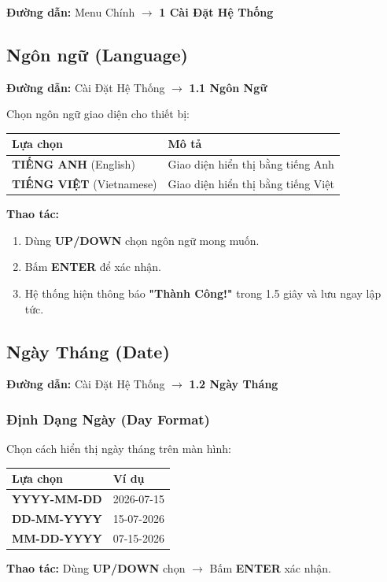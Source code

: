 \documentclass[12pt,a4paper]{article}
\begin{document}
\textbf{Đường dẫn:} Menu Chính $\rightarrow$ \textbf{1 Cài Đặt Hệ Thống}

\subsection{Ngôn ngữ (Language)}
\textbf{Đường dẫn:} Cài Đặt Hệ Thống $\rightarrow$ \textbf{1.1 Ngôn Ngữ}

Chọn ngôn ngữ giao diện cho thiết bị:
\begin{table}[H]
\centering
\begin{tabularx}{\textwidth}{|l|X|}
\hline
\textbf{Lựa chọn} & \textbf{Mô tả} \\ \hline
\textbf{TIẾNG ANH} (English) & Giao diện hiển thị bằng tiếng Anh \\ \hline
\textbf{TIẾNG VIỆT} (Vietnamese) & Giao diện hiển thị bằng tiếng Việt \\ \hline
\end{tabularx}
\end{table}

\textbf{Thao tác:}
\begin{enumerate}
    \item Dùng \textbf{UP/DOWN} chọn ngôn ngữ mong muốn.
    \item Bấm \textbf{ENTER} để xác nhận.
    \item Hệ thống hiện thông báo \textbf{"Thành Công!"} trong 1.5 giây và lưu ngay lập tức.
\end{enumerate}

\subsection{Ngày Tháng (Date)}
\textbf{Đường dẫn:} Cài Đặt Hệ Thống $\rightarrow$ \textbf{1.2 Ngày Tháng}

\subsubsection{Định Dạng Ngày (Day Format)}
Chọn cách hiển thị ngày tháng trên màn hình:
\begin{table}[H]
\centering
\begin{tabularx}{0.7\textwidth}{|l|X|}
\hline
\textbf{Lựa chọn} & \textbf{Ví dụ} \\ \hline
\textbf{YYYY-MM-DD} & 2026-07-15 \\ \hline
\textbf{DD-MM-YYYY} & 15-07-2026 \\ \hline
\textbf{MM-DD-YYYY} & 07-15-2026 \\ \hline
\end{tabularx}
\end{table}
\textbf{Thao tác:} Dùng \textbf{UP/DOWN} chọn $\rightarrow$ Bấm \textbf{ENTER} xác nhận.
\end{document}
